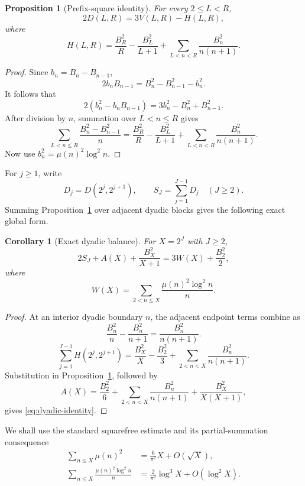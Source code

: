 \documentclass[11pt,a4paper]{amsart}
\newtheorem{proposition}[theorem]{Proposition}
\newtheorem{corollary}[theorem]{Corollary}
\theoremstyle{definition}
\theoremstyle{remark}
\begin{document}
\begin{proposition}[Prefix-square identity]\label{prop:identity}
For every $2\leq L<R$,
\begin{equation}\label{eq:identity}
 2D(L,R)=3V(L,R)-H(L,R),
\end{equation}
where
\begin{equation}\label{eq:H}
 H(L,R)=\frac{B_R^2}{R}-\frac{B_L^2}{L+1}
 +\sum_{L<n<R}\frac{B_n^2}{n(n+1)}.
\end{equation}
\end{proposition}

\begin{proof}
Since $b_n=B_n-B_{n-1}$,
\[
 2b_nB_{n-1}=B_n^2-B_{n-1}^2-b_n^2.
\]
It follows that
\[
 2(b_n^2-b_nB_{n-1})
 =3b_n^2-B_n^2+B_{n-1}^2.
\]
After division by $n$, summation over $L<n\leq R$ gives
\[
 \sum_{L<n\leq R}\frac{B_n^2-B_{n-1}^2}{n}
 =\frac{B_R^2}{R}-\frac{B_L^2}{L+1}
 +\sum_{L<n<R}\frac{B_n^2}{n(n+1)}.
\]
Now use $b_n^2=\mu(n)^2\log^2 n$.
\end{proof}

For $j\geq1$, write
\begin{equation}\label{eq:dyadic-defects}
 D_j=D(2^j,2^{j+1}),
 \qquad
 S_J=\sum_{j=1}^{J-1}D_j\quad(J\geq2).
\end{equation}
Summing Proposition~\ref{prop:identity} over adjacent dyadic blocks gives
the following exact global form.

\begin{corollary}[Exact dyadic balance]\label{cor:dyadic-identity}
For $X=2^J$ with $J\geq2$,
\begin{equation}\label{eq:dyadic-identity}
 2S_J+A(X)+\frac{B_X^2}{X+1}
 =3W(X)+\frac{B_2^2}{2},
\end{equation}
where
\[
 W(X)=\sum_{2<n\leq X}\frac{\mu(n)^2\log^2n}{n}.
\]
\end{corollary}

\begin{proof}
At an interior dyadic boundary $n$, the adjacent endpoint terms combine as
\[
 \frac{B_n^2}{n}-\frac{B_n^2}{n+1}
 =\frac{B_n^2}{n(n+1)}.
\]
\[
 \sum_{j=1}^{J-1}H(2^j,2^{j+1})
 =\frac{B_X^2}{X}-\frac{B_2^2}{3}
 +\sum_{2<n<X}\frac{B_n^2}{n(n+1)}.
\]
Substitution in Proposition~\ref{prop:identity}, followed by
\[
 A(X)=\frac{B_2^2}{6}
 +\sum_{2<n<X}\frac{B_n^2}{n(n+1)}
 +\frac{B_X^2}{X(X+1)},
\]
gives \eqref{eq:dyadic-identity}.
\end{proof}

We shall use the standard squarefree estimate and its partial-summation
consequence
\begin{align}
 \sum_{n\leq X}\mu(n)^2&=\frac{6}{\pi^2}X+O(\sqrt X),\label{eq:squarefree}\\
 \sum_{n\leq X}\frac{\mu(n)^2\log^2n}{n}
 &=\frac{2}{\pi^2}\log^3X+O(\log^2X).\label{eq:weighted-squarefree}
\end{align}
\end{document}
